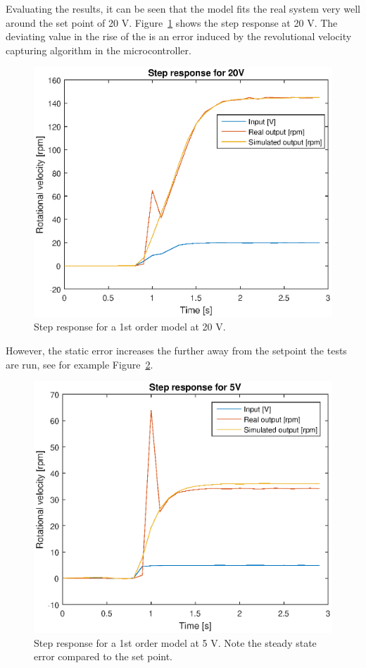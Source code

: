 Evaluating the results, it can be seen that the model fits the real system very
well around the set point of 20 V. Figure~\ref{fig:1storder_20} shows the step
response at 20 V. The deviating value in the rise of the is an error induced by
the revolutional velocity capturing algorithm in the microcontroller.
\begin{figure}[H]
    \label{fig:1storder_20}
    \centering
    \includegraphics[width=\textwidth]{./img/testrig_20Vstep_no_i_no_fric.eps}
    \caption{Step response for a 1st order model at 20 V.}
\end{figure}
However, the static error increases the further away from the setpoint the tests
are run, see for example Figure~\ref{fig:1storder_5}.
\begin{figure}[H]
    \label{fig:1storder_5}
    \centering
    \includegraphics[width=\textwidth]{./img/testrig_5Vstep_no_i_no_fric.eps}
    \caption{Step response for a 1st order model at 5 V. Note the steady state
    error compared to the set point.}
\end{figure}
